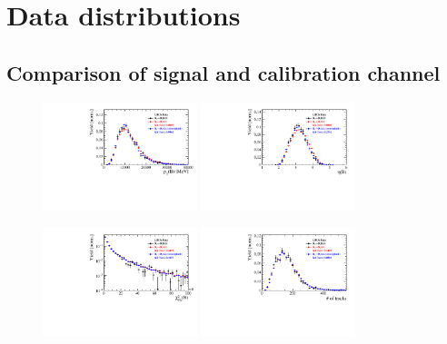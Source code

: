 
\section{Data distributions}
\subsection{Comparison of signal and calibration channel}

\begin{figure}[h]
\centering
\includegraphics[height=!,width=0.4\textwidth]{figs/dataVsMC/norm2signal/Ds2all_Bs_PT.pdf}
\includegraphics[height=!,width=0.4\textwidth]{figs/dataVsMC/norm2signal/Ds2all_Bs_ETA.pdf}

\includegraphics[height=!,width=0.4\textwidth]{figs/dataVsMC/norm2signal/Ds2all_Bs_FDCHI2_OWNPV.pdf}
\includegraphics[height=!,width=0.4\textwidth]{figs/dataVsMC/norm2signal/Ds2all_NTracks.pdf}


\end{figure}
